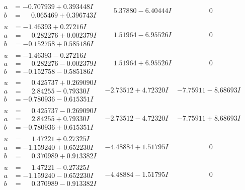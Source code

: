 \documentclass[1p]{elsarticle_modified}
\theoremstyle{definition}
\begin{document}
$$\begin{array}{c|c|c}
\begin{aligned}
a &= -0.707939 + 0.393448 I \\
b &= \phantom{-}0.065469 + 0.396743 I\end{aligned}
 & \phantom{-}5.37880 - 6.40444 I & \phantom{-0.000000 } 0 \\ \hline\begin{aligned}
u &= -1.46393 + 0.27216 I \\
a &= \phantom{-}0.282276 + 0.002379 I \\
b &= -0.152758 + 0.585186 I\end{aligned}
 & \phantom{-}1.51964 - 6.95526 I & \phantom{-0.000000 } 0 \\ \hline\begin{aligned}
u &= -1.46393 - 0.27216 I \\
a &= \phantom{-}0.282276 - 0.002379 I \\
b &= -0.152758 - 0.585186 I\end{aligned}
 & \phantom{-}1.51964 + 6.95526 I & \phantom{-0.000000 } 0 \\ \hline\begin{aligned}
u &= \phantom{-}0.425737 + 0.269090 I \\
a &= \phantom{-}2.84255 - 0.79330 I \\
b &= -0.780936 - 0.615351 I\end{aligned}
 & -2.73512 + 4.72320 I & -7.75911 - 8.68693 I \\ \hline\begin{aligned}
u &= \phantom{-}0.425737 - 0.269090 I \\
a &= \phantom{-}2.84255 + 0.79330 I \\
b &= -0.780936 + 0.615351 I\end{aligned}
 & -2.73512 - 4.72320 I & -7.75911 + 8.68693 I \\ \hline\begin{aligned}
u &= \phantom{-}1.47221 + 0.27325 I \\
a &= -1.159240 + 0.652230 I \\
b &= \phantom{-}0.370989 + 0.913382 I\end{aligned}
 & -4.48884 + 1.51795 I & \phantom{-0.000000 } 0 \\ \hline\begin{aligned}
u &= \phantom{-}1.47221 - 0.27325 I \\
a &= -1.159240 - 0.652230 I \\
b &= \phantom{-}0.370989 - 0.913382 I\end{aligned}
 & -4.48884 - 1.51795 I & \phantom{-0.000000 } 0\\

\end{array}$$
\end{document}
